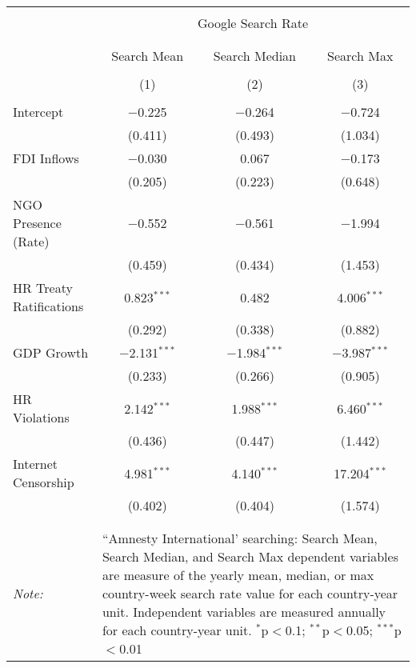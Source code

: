 
\begin{table}[!htbp] \centering 
  \caption{} 
  \label{} 
\begin{tabular}{@{\extracolsep{5pt}}lccc} 
\\[-1.8ex]\hline 
\hline \\[-1.8ex] 
 & \multicolumn{3}{c}{Google Search Rate} \\ 
\cline{2-4} 
\\[-1.8ex] & \multicolumn{3}{c}{ } \\ 
 & Search Mean & Search Median & Search Max \\ 
\\[-1.8ex] & (1) & (2) & (3)\\ 
\hline \\[-1.8ex] 
 Intercept & $-$0.225 & $-$0.264 & $-$0.724 \\ 
  & (0.411) & (0.493) & (1.034) \\ 
  FDI Inflows & $-$0.030 & 0.067 & $-$0.173 \\ 
  & (0.205) & (0.223) & (0.648) \\ 
  NGO Presence (Rate) & $-$0.552 & $-$0.561 & $-$1.994 \\ 
  & (0.459) & (0.434) & (1.453) \\ 
  HR Treaty Ratifications & 0.823$^{***}$ & 0.482 & 4.006$^{***}$ \\ 
  & (0.292) & (0.338) & (0.882) \\ 
  GDP Growth & $-$2.131$^{***}$ & $-$1.984$^{***}$ & $-$3.987$^{***}$ \\ 
  & (0.233) & (0.266) & (0.905) \\ 
  HR Violations & 2.142$^{***}$ & 1.988$^{***}$ & 6.460$^{***}$ \\ 
  & (0.436) & (0.447) & (1.442) \\ 
  Internet Censorship & 4.981$^{***}$ & 4.140$^{***}$ & 17.204$^{***}$ \\ 
  & (0.402) & (0.404) & (1.574) \\ 
 \hline \\[-1.8ex] 
\hline 
\hline \\[-1.8ex] 
\textit{Note:}  & \multicolumn{3}{l}{\parbox[t]{8cm}{``Amnesty International' searching: Search Mean, Search Median, and Search Max dependent variables are measure of the yearly mean, median, or max country-week search rate value for each country-year unit. Independent variables are measured annually for each country-year unit. $^{*}$p$<$0.1; $^{**}$p$<$0.05; $^{***}$p$<$0.01}} \\ 
\end{tabular} 
\end{table} 
